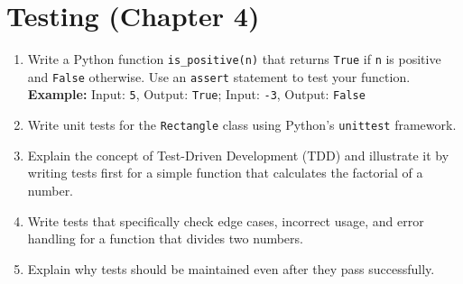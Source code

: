 \documentclass{article}
\begin{document}
\section*{Testing (Chapter 4)}

\begin{enumerate}
    \item Write a Python function \texttt{is\_positive(n)} that returns \texttt{True} if \texttt{n} is positive and \texttt{False} otherwise. Use an \texttt{assert} statement to test your function.\\
    \textbf{Example:} Input: \texttt{5}, Output: \texttt{True}; Input: \texttt{-3}, Output: \texttt{False}

    \item Write unit tests for the \texttt{Rectangle} class using Python's \texttt{unittest} framework.

    \item Explain the concept of Test-Driven Development (TDD) and illustrate it by writing tests first for a simple function that calculates the factorial of a number.

    \item Write tests that specifically check edge cases, incorrect usage, and error handling for a function that divides two numbers.

    \item Explain why tests should be maintained even after they pass successfully.
\end{enumerate}
\end{document}
